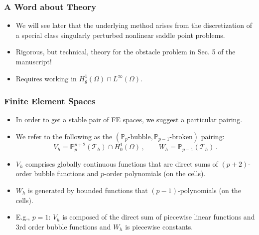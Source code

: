 \documentclass[aspectratio=169,xcolor=dvipsnames,11pt]{beamer}
\begin{document}
\begin{frame}\frametitle{A Word about Theory}
\begin{itemize}
\item We will see later that the underlying method arises from the discretization of a special class singularly perturbed nonlinear saddle point problems.
\item Rigorous, but technical, theory for the obstacle problem in Sec. 5 of the manuscript!
\item Requires working in $H^1_{g}(\Omega) \cap L^{\infty}(\Omega)$.
\end{itemize}
\end{frame}

\begin{frame}\frametitle{Finite Element Spaces}
\begin{itemize}
\item In order to get a stable pair of FE spaces, we suggest a particular pairing.
\item We refer to the following as the $(\mathbb{P}_p\text{-bubble},\mathbb{P}_{p-1}\text{-broken})$ pairing:
\begin{equation*}
\label{eq:SubspacePair1}
	V_h = \mathbb{P}_{p}^{p+2}(\mathcal{T}_h)\cap H^1_0(\Omega)
	\,,\qquad
	W_h = \mathbb{P}_{p-1}(\mathcal{T}_h)
	\,.
\end{equation*}
\item $V_h$ comprises globally continuous functions that are direct sums of $(p+2)$-order bubble functions and $p$-order polynomials (on the cells).
\item $W_h$ is generated by bounded functions that $(p-1)$-polynomials (on the cells).
\item E.g., $p = 1$: $V_h$ is composed of the direct sum of piecewise linear functions and 3rd order bubble functions and $W_h$ is piecewise constants.
\end{itemize}
\end{frame}
\end{document}
